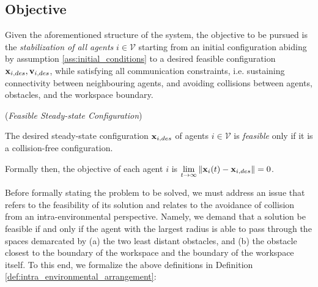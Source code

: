 \subsection{Objective}

Given the aforementioned structure of the system, the objective to be
pursued is the \textit{stabilization of all agents} $i \in \mathcal{V}$ starting
from an initial configuration abiding by assumption
\eqref{ass:initial_conditions} to a desired feasible configuration
$\bm{\mathbf{x}}_{i,des}, \bm{\mathbf{v}}_{i,des}$, while
satisfying all communication constraints, i.e. sustaining connectivity between
neighbouring agents, and avoiding collisions between agents, obstacles, and the
workspace boundary.

\begin{bw_box}
\begin{definition} (\textit{Feasible Steady-state Configuration})

The desired steady-state configuration $\bm{\mathbf{x}}_{i,des}$ of agents
$i \in \mathcal{V}$ is \textit{feasible} only if it is a collision-free
configuration.

\end{definition}
\end{bw_box}

Formally then, the objective of each agent $i$ is
$\lim\limits_{t \to \infty} \|\bm{\mathbf{x}}_i(t) - \bm{\mathbf{x}}_{i,des}\| = 0$.

Before formally stating the problem to be solved, we must address an issue
that refers to the feasibility of its solution and relates to the avoidance of
collision from an intra-environmental perspective. Namely, we demand that a
solution be feasible if and only if the agent with the largest radius is able to
pass through the spaces demarcated by (a) the two least distant obstacles,
and (b) the obstacle closest to the boundary of the workspace and the
boundary of the workspace itself. To this end, we formalize the above
definitions in Definition \eqref{def:intra_environmental_arrangement}:

